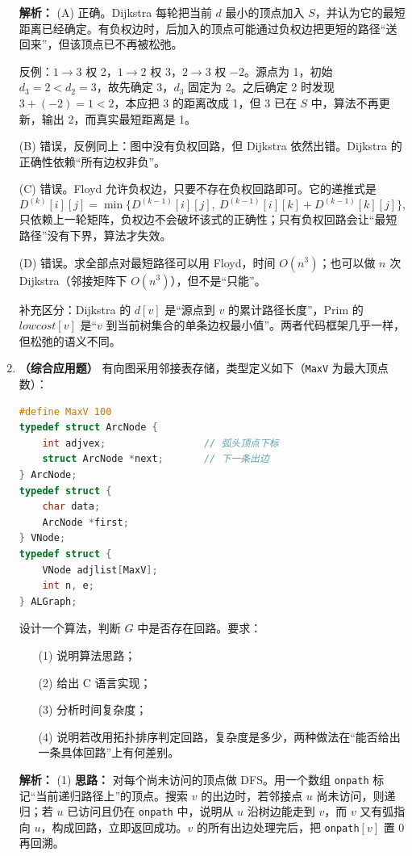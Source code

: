 \begin{enumerate}[resume]
\ifshowsolutions\par\noindent\textbf{解析：} (A) 正确。Dijkstra 每轮把当前 $d$ 最小的顶点加入 $S$，并认为它的最短距离已经确定。有负权边时，后加入的顶点可能通过负权边把更短的路径“送回来”，但该顶点已不再被松弛。

反例：$1\to3$ 权 2，$1\to2$ 权 3，$2\to3$ 权 $-2$。源点为 1，初始 $d_3=2<d_2=3$，故先确定 3，$d_3$ 固定为 2。之后确定 2 时发现 $3+(-2)=1<2$，本应把 3 的距离改成 1，但 3 已在 $S$ 中，算法不再更新，输出 2，而真实最短距离是 1。

(B) 错误，反例同上：图中没有负权回路，但 Dijkstra 依然出错。Dijkstra 的正确性依赖“所有边权非负”。

(C) 错误。Floyd 允许负权边，只要不存在负权回路即可。它的递推式是
\[
D^{(k)}[i][j]=\min\bigl\{D^{(k-1)}[i][j],\ D^{(k-1)}[i][k]+D^{(k-1)}[k][j]\bigr\},
\]
只依赖上一轮矩阵，负权边不会破坏该式的正确性；只有负权回路会让“最短路径”没有下界，算法才失效。

(D) 错误。求全部点对最短路径可以用 Floyd，时间 $O(n^3)$；也可以做 $n$ 次 Dijkstra（邻接矩阵下 $O(n^3)$），但不是“只能”。

补充区分：Dijkstra 的 $d[v]$ 是“源点到 $v$ 的累计路径长度”，Prim 的 $\mathit{lowcost}[v]$ 是“$v$ 到当前树集合的单条边权最小值”。两者代码框架几乎一样，但松弛的语义不同。

\else \answerarea[6] \fi

\item \textbf{（综合应用题）} 有向图采用邻接表存储，类型定义如下（\texttt{MaxV} 为最大顶点数）：
\begin{lstlisting}[language=C]
#define MaxV 100
typedef struct ArcNode {
    int adjvex;                 // 弧头顶点下标
    struct ArcNode *next;       // 下一条出边
} ArcNode;
typedef struct {
    char data;
    ArcNode *first;
} VNode;
typedef struct {
    VNode adjlist[MaxV];
    int n, e;
} ALGraph;
\end{lstlisting}
设计一个算法，判断 $G$ 中是否存在回路。要求：
\begin{enumerate}
\item[(1)] 说明算法思路；
\item[(2)] 给出 C 语言实现；
\item[(3)] 分析时间复杂度；
\item[(4)] 说明若改用拓扑排序判定回路，复杂度是多少，两种做法在“能否给出一条具体回路”上有何差别。
\end{enumerate}

\ifshowsolutions\par\noindent\textbf{解析：}
(1) \textbf{思路：} 对每个尚未访问的顶点做 DFS。用一个数组 \texttt{onpath} 标记“当前递归路径上”的顶点。搜索 $v$ 的出边时，若邻接点 $u$ 尚未访问，则递归；若 $u$ 已访问且仍在 \texttt{onpath} 中，说明从 $u$ 沿树边能走到 $v$，而 $v$ 又有弧指向 $u$，构成回路，立即返回成功。$v$ 的所有出边处理完后，把 \texttt{onpath}$[v]$ 置 0 再回溯。


\end{enumerate}
